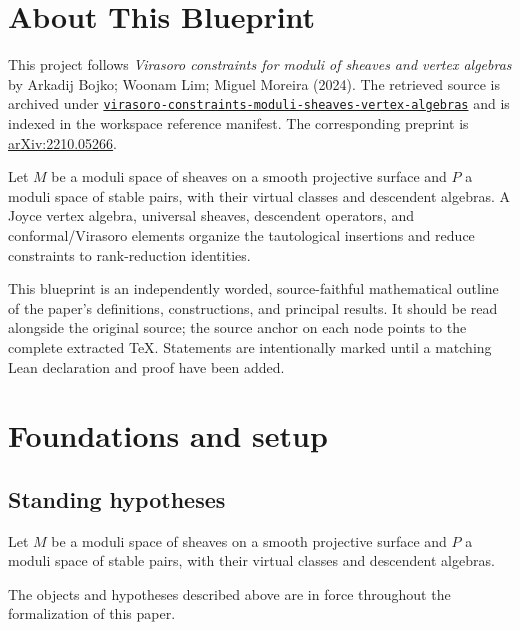 

\chapter*{About This Blueprint}
\label{virasoro-constraints-moduli-sheaves-vertex-algebras-about}

This project follows \emph{Virasoro constraints for moduli of sheaves and vertex algebras} by Arkadij Bojko; Woonam Lim; Miguel Moreira (2024). The
retrieved source is archived under
\href{../../../../../references/virasoro-constraints-moduli-sheaves-vertex-algebras/}{\texttt{virasoro-constraints-moduli-sheaves-vertex-algebras}} and is indexed in
the workspace reference manifest. The corresponding preprint is
\href{https://arxiv.org/abs/2210.05266}{arXiv:2210.05266}.

Let $M$ be a moduli space of sheaves on a smooth projective surface and $P$ a moduli space of stable pairs, with their virtual classes and descendent algebras. A Joyce vertex algebra, universal sheaves, descendent operators, and conformal/Virasoro elements organize the tautological insertions and reduce constraints to rank-reduction identities.

This blueprint is an independently worded, source-faithful mathematical
outline of the paper's definitions, constructions, and principal results. It
should be read alongside the original source; the source anchor on each node
points to the complete extracted TeX. Statements are intentionally marked
\notready until a matching Lean declaration and proof have been added.

\chapter{Foundations and setup}
\label{chap:virasoro-constraints-moduli-sheaves-vertex-algebras-foundations}

\section{Standing hypotheses}
\label{sec:virasoro-constraints-moduli-sheaves-vertex-algebras-standing}

Let $M$ be a moduli space of sheaves on a smooth projective surface and $P$ a moduli space of stable pairs, with their virtual classes and descendent algebras.

\begin{convention}
\label{virasoro-constraints-moduli-sheaves-vertex-algebras-setup}
The objects and hypotheses described above are in force throughout the
formalization of this paper.
\notready
\end{convention}

